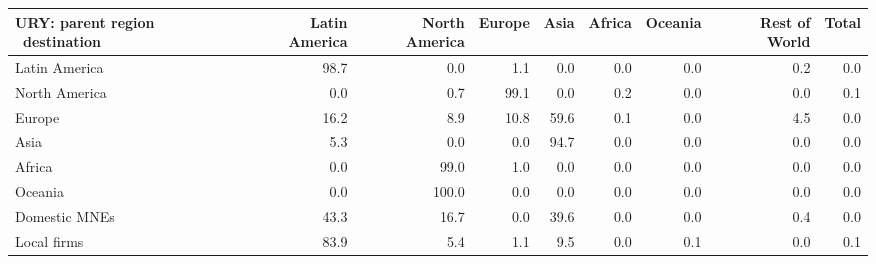 \begin{tabular}{lrrrrrrrr}
\toprule
URY: parent region \ destination & Latin America & North America & Europe & Asia & Africa & Oceania & Rest of World & Total \\
\midrule
Latin America & 98.7 & 0.0 & 1.1 & 0.0 & 0.0 & 0.0 & 0.2 & 0.0 \\
North America & 0.0 & 0.7 & 99.1 & 0.0 & 0.2 & 0.0 & 0.0 & 0.1 \\
Europe & 16.2 & 8.9 & 10.8 & 59.6 & 0.1 & 0.0 & 4.5 & 0.0 \\
Asia & 5.3 & 0.0 & 0.0 & 94.7 & 0.0 & 0.0 & 0.0 & 0.0 \\
Africa & 0.0 & 99.0 & 1.0 & 0.0 & 0.0 & 0.0 & 0.0 & 0.0 \\
Oceania & 0.0 & 100.0 & 0.0 & 0.0 & 0.0 & 0.0 & 0.0 & 0.0 \\
Domestic MNEs & 43.3 & 16.7 & 0.0 & 39.6 & 0.0 & 0.0 & 0.4 & 0.0 \\
Local firms & 83.9 & 5.4 & 1.1 & 9.5 & 0.0 & 0.1 & 0.0 & 0.1 \\
\bottomrule
\end{tabular}
